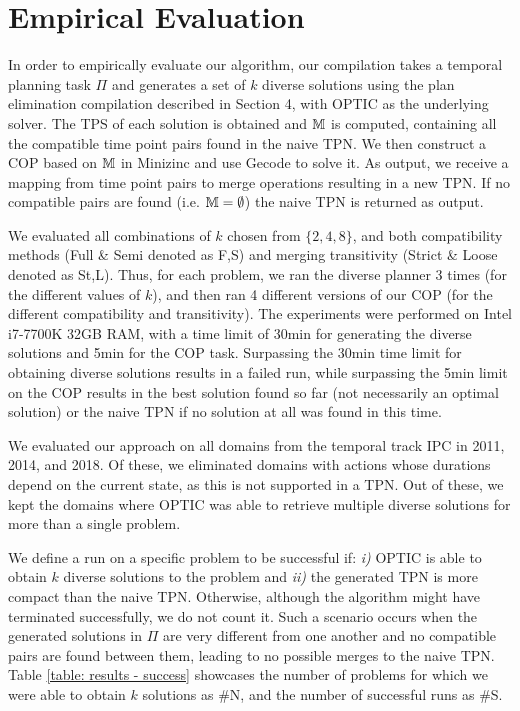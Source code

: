 \section{Empirical Evaluation}
In order to empirically evaluate our algorithm, our compilation takes a temporal planning task $\Pi$ and generates a set of $k$ diverse solutions using the plan elimination compilation described in Section 4, with OPTIC \cite{benton2012temporal} as the underlying solver. The TPS of each solution is obtained and $\mathbb{M}$ is computed, containing all the compatible time point pairs found in the naive TPN.
We then construct a COP based on $\mathbb{M}$ in Minizinc \cite{nethercote2007minizinc} and use Gecode \cite{gecode} to solve it. As output, we receive a mapping from time point pairs to merge operations resulting in a new TPN.
If no compatible pairs are found (i.e. $\mathbb{M} = \emptyset$) the naive TPN is returned as output. 


We evaluated all combinations of $k$ chosen from $\{2,4,8\}$, and both compatibility methods 
(Full \& Semi denoted as F,S) and merging transitivity (Strict \& Loose denoted as St,L). Thus, for each problem, we ran the diverse planner 3 times (for the different values of $k$), and then ran 4 different versions of our COP (for the different compatibility and transitivity). The experiments were performed on Intel i7-7700K 32GB RAM, with a time limit of 30min for generating the diverse solutions and 5min for the COP task.
Surpassing the 30min time limit for obtaining diverse solutions results in a failed run, while surpassing the 5min limit on the COP results in the best solution found so far (not necessarily an optimal solution) or the naive TPN if no solution at all was found in this time.
 


We evaluated our approach on all domains from the temporal track IPC in 2011, 2014, and 2018. Of these, we eliminated domains with actions whose durations depend on the current state, as this is not supported in a TPN.
Out of these, we kept the domains where OPTIC was able to retrieve multiple diverse solutions for more than a single problem.

We define a run on a specific problem to be successful if: \textit{i)} OPTIC is able to obtain $k$
diverse solutions to the problem and \textit{ii)} the generated TPN is more compact than the naive TPN.
Otherwise, although the algorithm might have terminated successfully, we do not count it.
Such a scenario occurs when the generated solutions in $\Pi$ are very different from one another 
and no compatible pairs are found between them, leading to no possible merges to the naive TPN.
Table \ref{table: results - success} showcases the number of problems for which we were
able to obtain $k$ solutions as \#N, and the number of successful runs as \#S.

